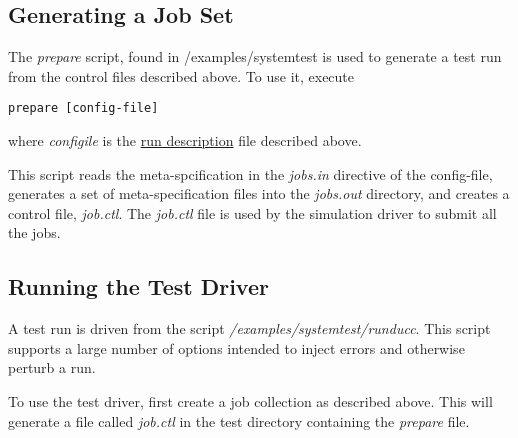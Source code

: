      \subsection{Generating a Job Set}

     The {\em prepare} script, found in \duccruntime/examples/systemtest is used
     to generate a test run from the control files described above.
     To use it, execute
\begin{verbatim}
prepare [config-file]
\end{verbatim}
     where {\em configile} is the \hyperref[subsec:simulation.run-description]{run description} file
     described above.

     This script reads the meta-spcification in the {\em jobs.in} directive of the
     config-file, generates a set of meta-specification files into the {\em jobs.out}
     directory, and creates a control file, {\em job.ctl}.  The {\em job.ctl} file is used
     by the simulation driver to submit all the jobs.
     

\subsection{Running the Test Driver}
    A test run is driven from the script {\em \duccruntime/examples/systemtest/runducc}. This
    script supports a large number of options intended to inject errors and otherwise
    perturb a run.

    To use the test driver, first create a job collection as described above.  This will
    generate a file called {\em job.ctl} in the test directory containing the {\em prepare}
    file.

